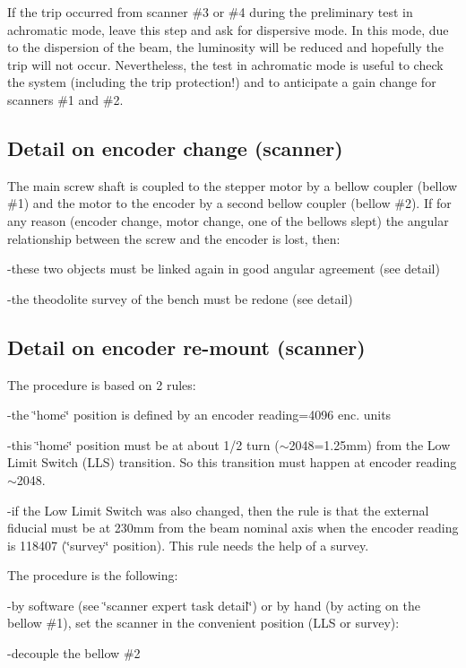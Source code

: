 If the trip occurred from scanner \#3 or \#4 during the preliminary test in
achromatic mode, leave this step and ask for dispersive mode. In this mode,
due to the dispersion of the beam, the luminosity will be reduced and hopefully
the trip will not occur. Nevertheless, the test in achromatic mode is useful
to check the system (including the trip protection!) and to anticipate a gain
change for scanners \#1 and \#2. 


\subsection{Detail on encoder change (scanner) }

The main screw shaft is coupled to the stepper motor by a bellow coupler (bellow
\#1) and the motor to the encoder by a second bellow coupler (bellow \#2). If
for any reason (encoder change, motor change, one of the bellows slept) the
angular relationship between the screw and the encoder is lost, then: 

-these two objects must be linked again in good angular agreement (see detail) 

-the theodolite survey of the bench must be redone (see detail) 


\subsection{Detail on encoder re-mount (scanner) }

The procedure is based on 2 rules: 

-the \char`\"{}home\char`\"{} position is defined by an encoder reading=4096
enc. units 

-this \char`\"{}home\char`\"{} position must be at about 1/2 turn (\( \sim  \)2048=1.25mm)
from the Low Limit Switch (LLS) transition. So this transition must happen
at encoder reading \( \sim  \)2048. 

-if the Low Limit Switch was also changed, then the rule is that the external
fiducial must be at 230mm from the beam nominal axis when the encoder reading
is 118407 (\char`\"{}survey\char`\"{} position). This rule needs the help of
a survey. 

The procedure is the following: 

-by software (see \char`\"{}scanner expert task detail\char`\"{}) or by hand
(by acting on the bellow \#1), set the scanner in the convenient position (LLS
or survey): 

-decouple the bellow \#2 

